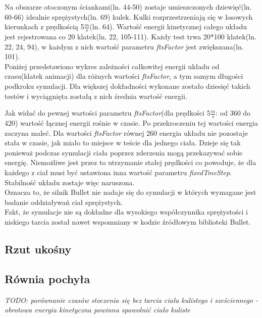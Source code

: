 
  
Na obszarze otoczonym ściankami(ln. 44-50) zostaje umieszczonych dziewięć(ln.
60-66) idealnie sprężystych(ln. 69) kulek. Kulki rozprzestrzeniają się w
losowych kierunkach z prędkością 5$ \frac{m}{s} $(ln. 64). Wartość energii
kinetycznej całego układu jest rejestrowana co 20 klatek(ln. 22, 105-111). Każdy
test trwa 20*100 klatek(ln. 22, 24, 94), w każdym z nich wartość parametru
\emph{ftsFactor} jest zwiększana(ln. 101).\\
Poniżej przedstawiono wykres zależności całkowitej energii układu od
czasu(klatek animacji) dla różnych wartości \emph{ftsFactor}, a tym samym
długości podkroku symulacji. Dla większej dokładności wykonane zostało dziesięć
takich testów i wyciągnięta zostałą z nich średnia wartość energii.



Jak widać do pewnej wartości parametru \emph{ftsFactor}(dla prędkości 5$
\frac{m}{s} $: od 360 do 420) wartość łącznej energii rośnie w czasie. Po
przekroczeniu tej wartości energia zaczyna maleć. Dla wartości \emph{ftsFactor}
równej 260 energia układu nie pozostaje stała w czasie, jak miało to miejsce w
teście dla jednego ciała. Dzieje się tak ponieważ podczas symulacji ciała
poprzez zderzenia mogą przekazywać sobie energię. Niemożliwe jest przez to
utrzymanie stałej prędkości co powoduje, że dla każdego z ciał musi być
ustawiona inna wartość parametru \emph{fixedTmeStep}. Stabilność układu zostaje
więc naruszona.\\
Oznacza to, że silnik Bullet nie nadaje się do symulacji w których wymagane jest
badanie oddziaływań ciał sprężystych.\\
Fakt, że symulacje nie są dokładne dla wysokiego współczynnika sprężystości i
niskiego tarcia został nawet wspomniany w kodzie źródłowym biblioteki Bullet.



\subsection{Rzut ukośny}

\subsection{Równia pochyła}
\emph{TODO: porównanie czasów stoczenia się bez tarcia ciała kulistego i
sześciennego - obrotowa energia kinetyczna powinna spowolnić ciało kuliste}

